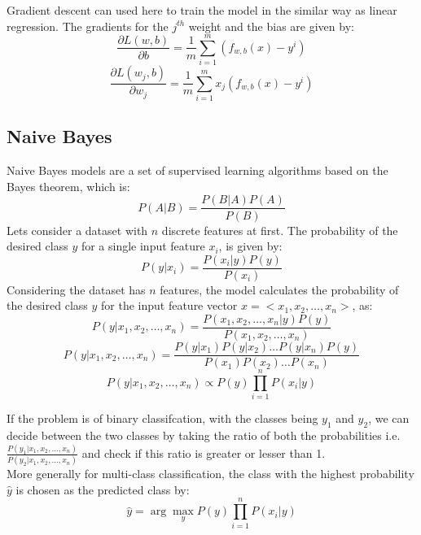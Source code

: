 \documentclass[12pt]{article}
\begin{document}
Gradient descent can used here to train the model in the similar way as linear regression.
The gradients for the $j^{th}$ weight and the bias are given by:
\begin{equation}
    \frac{\partial L(w,b)}{\partial b} = \frac{1}{m} \sum_{i=1}^{m} (f_{w,b}(x)-y^i)
\end{equation}
\begin{equation}
    \frac{\partial L(w_j,b)}{\partial w_j} = \frac{1}{m} \sum_{i=1}^{m} x_j(f_{w,b}(x)-y^i)
\end{equation}


\subsection{Naive Bayes}
Naive Bayes models are a set of supervised learning algorithms based on the Bayes theorem, which is:
\begin{equation}
    P(A|B) = \frac{P(B|A)P(A)}{P(B)}
\end{equation}
Lets consider a dataset with $n$ discrete features at first. The probability of the desired class $y$ for a single input feature $x_i$, is given by:
\begin{equation}
    P(y|x_i) = \frac{P(x_i|y)P(y)}{P(x_i)}
\end{equation}
Considering the dataset has $n$ features, the model calculates the probability of the desired class $y$ for the input feature vector $x = <x_1,x_2,\dots,x_n>$, as:
\begin{equation*}
    P(y|x_1,x_2,\dots,x_n) = \frac{P(x_1,x_2,\dots,x_n|y)P(y)}{P(x_1,x_2,\dots,x_n)}
\end{equation*}
\begin{equation*}
    P(y|x_1,x_2,\dots,x_n) = \frac{P(y|x_1)P(y|x_2)\dots P(y|x_n)P(y)}{P(x_1)P(x_2)\dots P(x_n)}
\end{equation*}
\begin{equation}
    P(y|x_1,x_2,\dots,x_n) \propto P(y) \prod_{i=1}^{n} P(x_i|y)
\end{equation}

If the problem is of binary classifcation, with the classes being $y_1$ and $y_2$, we can decide between the two classes by taking the ratio of both the probabilities i.e. $\frac{P(y_1|x_1,x_2,\dots,x_n)}{P(y_2|x_1,x_2,\dots,x_n)}$ and check if this ratio is greater or lesser than 1.\\
More generally for multi-class classification, the class with the highest probability $\hat{y}$ is chosen as the predicted class by: 
\begin{equation}
    \hat{y} = \arg \max_{y} P(y) \prod_{i=1}^{n} P(x_i|y)
\end{equation}
\end{document}
